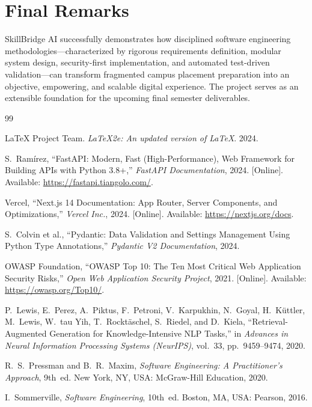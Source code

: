 \documentclass[12pt,a4paper,oneside]{report}
\begin{document}
\section{Final Remarks}
SkillBridge AI successfully demonstrates how disciplined software engineering methodologies—characterized by rigorous requirements definition, modular system design, security-first implementation, and automated test-driven validation—can transform fragmented campus placement preparation into an objective, empowering, and scalable digital experience. The project serves as an extensible foundation for the upcoming final semester deliverables.

\newpage
\thispagestyle{empty}
\hbox{}
\thispagestyle{empty}
\newpage

\setcounter{page}{13}
\begin{thebibliography}{99}

LaTeX Project Team. \textit{LaTeX2e: An updated version of LaTeX}. 2024.

S.~Ram\'irez, ``FastAPI: Modern, Fast (High-Performance), Web Framework for Building APIs with Python 3.8+,'' \textit{FastAPI Documentation}, 2024. [Online]. Available: \url{https://fastapi.tiangolo.com/}.

Vercel, ``Next.js 14 Documentation: App Router, Server Components, and Optimizations,'' \textit{Vercel Inc.}, 2024. [Online]. Available: \url{https://nextjs.org/docs}.

S.~Colvin et al., ``Pydantic: Data Validation and Settings Management Using Python Type Annotations,'' \textit{Pydantic V2 Documentation}, 2024.

OWASP Foundation, ``OWASP Top 10: The Ten Most Critical Web Application Security Risks,'' \textit{Open Web Application Security Project}, 2021. [Online]. Available: \url{https://owasp.org/Top10/}.

P.~Lewis, E.~Perez, A.~Piktus, F.~Petroni, V.~Karpukhin, N.~Goyal, H.~K\"{u}ttler, M.~Lewis, W.~tau Yih, T.~Rockt\"{a}schel, S.~Riedel, and D.~Kiela, ``Retrieval-Augmented Generation for Knowledge-Intensive NLP Tasks,'' in \textit{Advances in Neural Information Processing Systems (NeurIPS)}, vol.~33, pp.~9459--9474, 2020.

R.~S.~Pressman and B.~R.~Maxim, \textit{Software Engineering: A Practitioner's Approach}, 9th~ed. New York, NY, USA: McGraw-Hill Education, 2020.

I.~Sommerville, \textit{Software Engineering}, 10th~ed. Boston, MA, USA: Pearson, 2016.

\end{thebibliography}
\end{document}
